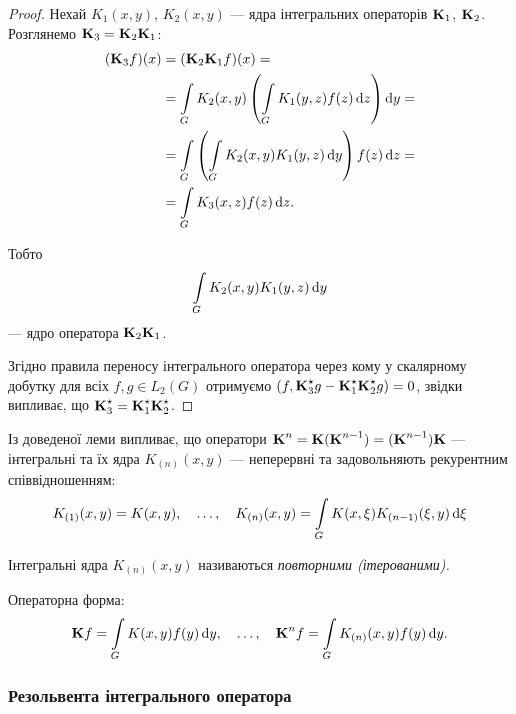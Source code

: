 \begin{proof}
	Нехай $K_1(x, y)$, $K_2(x, y)$ --- ядра інтегральних операторів $\bf{K}_1$, $\bf{K}_2$. Розглянемо $\bf{K}_3 = \bf{K}_2 \bf{K}_1$:
	\begin{equation}
		\begin{aligned}
			(\bf{K}_3 f)(x) &= (\bf{K}_2\bf{K}_1f)(x) = \\
			&= \Int_G K_2(x, y) \left( \Int_G K_1(y, z) f(z) \diff z \right) \diff y = \\
			&= \Int_G \left( \Int_G K_2(x, y) K_1(y, z) \diff y\right) f(z) \diff z = \\
			&= \Int_G K_3(x, z) f(z) \diff z.
		\end{aligned}
	\end{equation}
	
	Тобто
	\begin{equation}
		\Int_G K_2(x, y) K_1(y, z) \diff y
	\end{equation}
	--- ядро оператора $\bf{K}_2\bf{K}_1$. \medskip

	Згідно правила переносу інтегрального оператора через кому у скалярному добутку для всіх $f, g \in L_2(G)$ отримуємо $(f, \bf{K}_3^\star g - \bf{K}_1^\star  \bf{K}_2^\star  g) = 0$, звідки випливає, що $\bf{K}_3^\star  = \bf{K}_1^\star  \bf{K}_2^\star $.
\end{proof}

Із доведеної леми випливає, що оператори $\bf{K}^n = \bf{K} (\bf{K}^{n - 1}) = (\bf{K}^{n - 1})\bf{K}$ --- інтегральні та їх ядра $K_{(n)}(x, y)$ --- неперервні та задовольняють рекурентним співвідношенням:
\begin{equation}
	K_{(1)}(x, y) = K(x, y), \quad \ldots, \quad K_{(n)}(x, y) = \Int_G K(x, \xi) K_{(n - 1)}(\xi, y) \diff \xi
\end{equation}

\begin{definition}
	Інтегральні ядра $K_{(n)}(x, y)$ називаються \it{повторними (ітерованими)}.
\end{definition}

Операторна форма:
\begin{equation}
	\bf{K}f = \Int_G K(x, y) f(y) \diff y, \quad \ldots, \quad \bf{K}^n f = \Int_G K_{(n)}(x, y)f(y) \diff y.
\end{equation}

\subsubsection{Резольвента інтегрального оператора}

